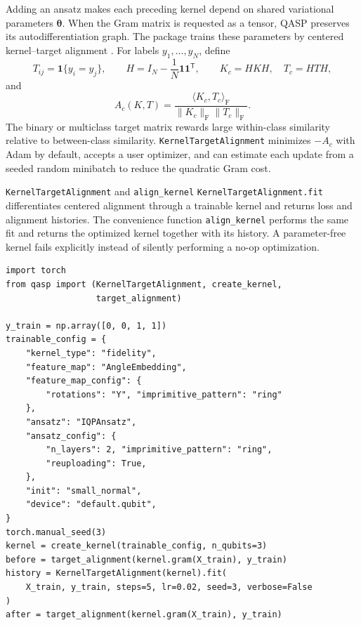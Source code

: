 \documentclass[10pt]{article}
\newcommand{\code}[1]{\texttt{#1}}
\begin{document}
Adding an ansatz makes each preceding kernel depend on shared variational
parameters $\bm\theta$.  When the Gram matrix is requested as a tensor, QASP
preserves its autodifferentiation graph.  The package trains these
parameters by centered kernel--target alignment
\cite{cortes2012alignment}.  For labels $y_1,\ldots,y_N$, define
\begin{equation}
  T_{ij}=\mathbf{1}\{y_i=y_j\},
  \qquad
  H=I_N-\frac{1}{N}\bm{1}\bm{1}^{\mathsf T},
  \qquad K_c=HKH,\quad T_c=HTH,
  \label{eq:kta-centering}
\end{equation}
and
\begin{equation}
  A_c(K,T)
  =\frac{\langle K_c,T_c\rangle_{\mathrm F}}
  {\lVert K_c\rVert_{\mathrm F}\lVert T_c\rVert_{\mathrm F}}.
  \label{eq:centered-kta}
\end{equation}
The binary or multiclass target matrix rewards large within-class similarity
relative to between-class similarity.  \code{KernelTargetAlignment} minimizes
$-A_c$ with Adam by default, accepts a user optimizer, and can estimate each
update from a seeded random minibatch to reduce the quadratic Gram cost.

\begin{qaspfeature}{\code{KernelTargetAlignment} and \code{align\_kernel}}
\code{KernelTargetAlignment.fit} differentiates centered alignment through a
trainable kernel and returns loss and alignment histories.  The convenience
function \code{align\_kernel} performs the same fit and returns the optimized
kernel together with its history.  A parameter-free kernel fails explicitly
instead of silently performing a no-op optimization.
\end{qaspfeature}

\begin{lstlisting}[caption={A trainable IQP fidelity kernel and centered target-alignment update.},label={lst:kta-kernel}]
import torch
from qasp import (KernelTargetAlignment, create_kernel,
                  target_alignment)

y_train = np.array([0, 0, 1, 1])
trainable_config = {
    "kernel_type": "fidelity",
    "feature_map": "AngleEmbedding",
    "feature_map_config": {
        "rotations": "Y", "imprimitive_pattern": "ring"
    },
    "ansatz": "IQPAnsatz",
    "ansatz_config": {
        "n_layers": 2, "imprimitive_pattern": "ring",
        "reuploading": True,
    },
    "init": "small_normal",
    "device": "default.qubit",
}
torch.manual_seed(3)
kernel = create_kernel(trainable_config, n_qubits=3)
before = target_alignment(kernel.gram(X_train), y_train)
history = KernelTargetAlignment(kernel).fit(
    X_train, y_train, steps=5, lr=0.02, seed=3, verbose=False
)
after = target_alignment(kernel.gram(X_train), y_train)
\end{lstlisting}
\end{document}
